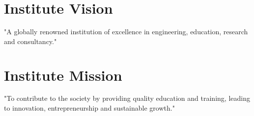 \clearpage
\vspace*{\fill}
\begin{onehalfspace}
\begin{center} 
\section*{Institute Vision}

		\begin{justify}
		"A globally renowned institution of excellence in engineering, education, research and consultancy."
		\end{justify}
				
		\section*{Institute Mission}
		\begin{justify}
		"To contribute to the society by providing quality education and training, leading to innovation, entrepreneurship and sustainable growth."
		\end{justify}

\end{center}
\end{onehalfspace}
\vspace*{\fill}